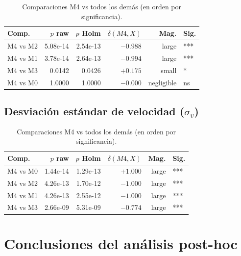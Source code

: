 \documentclass[12pt,a4paper,oneside]{book}
\begin{document}
\begin{table}[H]
\centering
\caption{Comparaciones M4 vs todos los demás (en orden por significancia).}
\begin{tabular}{lrrrrl}
\toprule
\textbf{Comp.} & \textbf{$p$ raw} & \textbf{$p$ Holm} & \textbf{$\delta(M4, X)$} & \textbf{Mag.} & \textbf{Sig.} \\
\midrule
M4 vs M2 & 5.08e-14 & 2.54e-13 & $-0.988$ & large & *** \\
M4 vs M1 & 3.78e-14 & 2.64e-13 & $-0.994$ & large & *** \\
M4 vs M3 & 0.0142 & 0.0426 & $+0.175$ & small & * \\
M4 vs M0 & 1.0000 & 1.0000 & $-0.000$ & negligible & ns \\
\bottomrule
\end{tabular}
\end{table}

\subsection{Desviación estándar de velocidad ($\sigma_v$)}

\begin{table}[H]
\centering
\caption{Comparaciones M4 vs todos los demás (en orden por significancia).}
\begin{tabular}{lrrrrl}
\toprule
\textbf{Comp.} & \textbf{$p$ raw} & \textbf{$p$ Holm} & \textbf{$\delta(M4, X)$} & \textbf{Mag.} & \textbf{Sig.} \\
\midrule
M4 vs M0 & 1.44e-14 & 1.29e-13 & $+1.000$ & large & *** \\
M4 vs M2 & 4.26e-13 & 1.70e-12 & $-1.000$ & large & *** \\
M4 vs M1 & 4.26e-13 & 2.55e-12 & $-1.000$ & large & *** \\
M4 vs M3 & 2.66e-09 & 5.31e-09 & $-0.774$ & large & *** \\
\bottomrule
\end{tabular}
\end{table}


\section{Conclusiones del análisis post-hoc}
\end{document}
